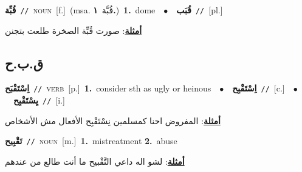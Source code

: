 \documentclass[10pt,a4paper,twoside]{article} %
\begin{document}
\begin{multicols}{2}
{\setlength\topsep{0pt}\textbf{\foreignlanguage{arabic}{قُبِّة}}\ {\color{gray}\texttt{//}\color{black}}\ \textsc{noun}\ [f.]\ \color{gray}(msa. \foreignlanguage{arabic}{قُبَّة}~\foreignlanguage{arabic}{\textbf{١.}})\color{black}\ \textbf{1.}~dome\ \ $\bullet$\ \ \setlength\topsep{0pt}\textbf{\foreignlanguage{arabic}{قُبَب}}\ {\color{gray}\texttt{//}\color{black}}\ [pl.]\  \begin{flushright}\color{gray}\foreignlanguage{arabic}{\textbf{\underline{\foreignlanguage{arabic}{أمثلة}}}: صورت قُبِّة الصخرة طلعت بتجنن}\end{flushright}\color{black}} \vspace{2mm}

\vspace{-3mm}
\subsection*{\color{blue}\foreignlanguage{arabic}{ق.ب.ح}\color{blue}{}} 

{\setlength\topsep{0pt}\textbf{\foreignlanguage{arabic}{اِسْتَقْبَح}}\ {\color{gray}\texttt{//}\color{black}}\ \textsc{verb}\ [p.]\ \textbf{1.}~consider sth as ugly or heinous\ \ $\bullet$\ \ \setlength\topsep{0pt}\textbf{\foreignlanguage{arabic}{اِسْتَقْبِح}}\ {\color{gray}\texttt{//}\color{black}}\ [c.]\ \ $\bullet$\ \ \setlength\topsep{0pt}\textbf{\foreignlanguage{arabic}{يِسْتَقْبِح}}\ {\color{gray}\texttt{//}\color{black}}\ [i.]\  \begin{flushright}\color{gray}\foreignlanguage{arabic}{\textbf{\underline{\foreignlanguage{arabic}{أمثلة}}}: المفروض احنا كمسلمين نِسْتَقْبِح الأفعال مش الأشخاص}\end{flushright}\color{black}} \vspace{2mm}

{\setlength\topsep{0pt}\textbf{\foreignlanguage{arabic}{تَقْبِيح}}\ {\color{gray}\texttt{//}\color{black}}\ \textsc{noun}\ [m.]\ \textbf{1.}~mistreatment  \textbf{2.}~abuse\  \begin{flushright}\color{gray}\foreignlanguage{arabic}{\textbf{\underline{\foreignlanguage{arabic}{أمثلة}}}: لشو اله داعي التَّقْبيح ما أنت طالع من عندهم}\end{flushright}\color{black}} \vspace{2mm}


\end{multicols}
\end{document}

